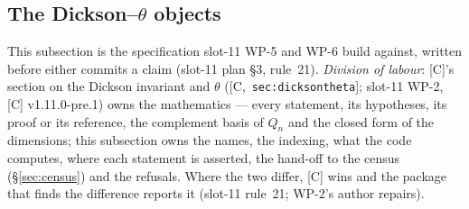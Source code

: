 \documentclass[11pt]{article}
\theoremstyle{remark}
\newcommand{\HA}[1]{[C,~\texttt{#1}]}      %
\begin{document}
\subsection{The Dickson--\texorpdfstring{$\theta$}{theta} objects}\label{sec:thetaobj}
This subsection is the specification slot-11 WP-5 and WP-6 build against, written before either
commits a claim (slot-11 plan \S3, rule~21). \emph{Division of labour}: [C]'s section on the
Dickson invariant and $\theta$ (\HA{sec:dicksontheta}; slot-11 WP-2, [C] v1.11.0-pre.1) owns
the mathematics --- every statement, its hypotheses, its proof or
its reference, the complement basis of $Q_n$ and the closed form of the dimensions; this subsection
owns the names, the indexing, what the code computes, where each statement is asserted, the
hand-off to the census (\S\ref{sec:census}) and the refusals. Where the two differ, [C] wins and
the package that finds the difference reports it (slot-11 rule~21; WP-2's author repairs).
\end{document}
